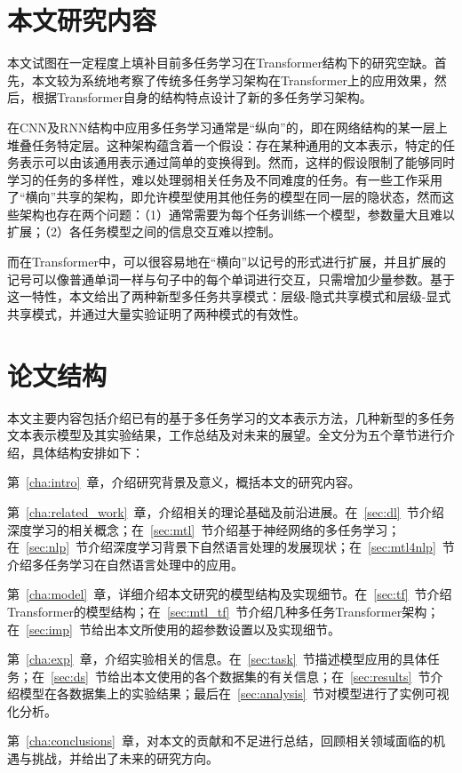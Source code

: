 \section{本文研究内容}

本文试图在一定程度上填补目前多任务学习在Transformer结构下的研究空缺。首先，本文较为系统地考察了传统多任务学习架构在Transformer上的应用效果，然后，根据Transformer自身的结构特点设计了新的多任务学习架构。

在CNN及RNN结构中应用多任务学习通常是“纵向”的，即在网络结构的某一层上堆叠任务特定层\cite{DBLP:conf/acl/SogaardG16}\cite{DBLP:conf/ijcai/ZhengCQ18}。这种架构蕴含着一个假设：存在某种通用的文本表示，特定的任务表示可以由该通用表示通过简单的变换得到。然而，这样的假设限制了能够同时学习的任务的多样性，难以处理弱相关任务及不同难度的任务。有一些工作采用了“横向”共享的架构，即允许模型使用其他任务的模型在同一层的隐状态\cite{DBLP:conf/ijcai/LiuQH16}\cite{DBLP:conf/cvpr/MisraSGH16}\cite{1705.08142}，然而这些架构也存在两个问题：（1）通常需要为每个任务训练一个模型，参数量大且难以扩展；（2）各任务模型之间的信息交互难以控制。

而在Transformer中，可以很容易地在“横向”以记号的形式进行扩展，并且扩展的记号可以像普通单词一样与句子中的每个单词进行交互，只需增加少量参数。基于这一特性，本文给出了两种新型多任务共享模式：层级-隐式共享模式和层级-显式共享模式，并通过大量实验证明了两种模式的有效性。

\section{论文结构}

本文主要内容包括介绍已有的基于多任务学习的文本表示方法，几种新型的多任务文本表示模型及其实验结果，工作总结及对未来的展望。全文分为五个章节进行介绍，具体结构安排如下：

第~\ref{cha:intro}~章，介绍研究背景及意义，概括本文的研究内容。

第~\ref{cha:related_work}~章，介绍相关的理论基础及前沿进展。在~\ref{sec:dl}~节介绍深度学习的相关概念；在~\ref{sec:mtl}~节介绍基于神经网络的多任务学习；在~\ref{sec:nlp}~节介绍深度学习背景下自然语言处理的发展现状；在~\ref{sec:mtl4nlp}~节介绍多任务学习在自然语言处理中的应用。

第~\ref{cha:model}~章，详细介绍本文研究的模型结构及实现细节。在~\ref{sec:tf}~节介绍Transformer的模型结构；在~\ref{sec:mtl_tf}~节介绍几种多任务Transformer架构；在~\ref{sec:imp}~节给出本文所使用的超参数设置以及实现细节。

第~\ref{cha:exp}~章，介绍实验相关的信息。在~\ref{sec:task}~节描述模型应用的具体任务；在~\ref{sec:ds}~节给出本文使用的各个数据集的有关信息；在~\ref{sec:results}~节介绍模型在各数据集上的实验结果；最后在~\ref{sec:analysis}~节对模型进行了实例可视化分析。

第~\ref{cha:conclusions}~章，对本文的贡献和不足进行总结，回顾相关领域面临的机遇与挑战，并给出了未来的研究方向。

